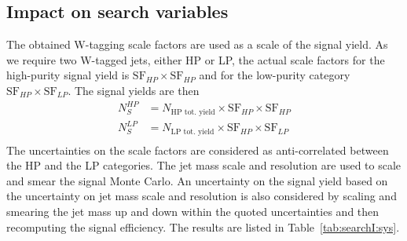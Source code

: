\subsection{Impact on search variables}
\label{sec:searchI:wtagimpact}
The obtained W-tagging scale factors are used as a scale of the signal yield. As we require two W-tagged jets, either HP or LP, the actual scale factors for the high-purity signal yield is $\textrm{SF}_{HP}\times\textrm{SF}_{HP}$ and for the low-purity category $\textrm{SF}_{HP}\times\textrm{SF}_{LP}$. The signal yields are then
\begin{align*}
N_{S}^{HP} &= N_{\textrm{HP tot. yield}} \times \textrm{SF}_{HP} \times \textrm{SF}_{HP}\\
N_{S}^{LP} &= N_{\textrm{LP tot. yield}} \times \textrm{SF}_{HP} \times \textrm{SF}_{LP}\\
\end{align*}
The uncertainties on the scale factors are considered as anti-correlated between the HP and the LP categories.
The jet mass scale and resolution are used to scale and smear the signal Monte Carlo. An uncertainty on the signal yield based on the uncertainty on jet mass scale and resolution is also considered by scaling and smearing the jet mass up and down within the quoted uncertainties and then recomputing the signal efficiency. The results are listed in Table~\ref{tab:searchI:sys}.
  
